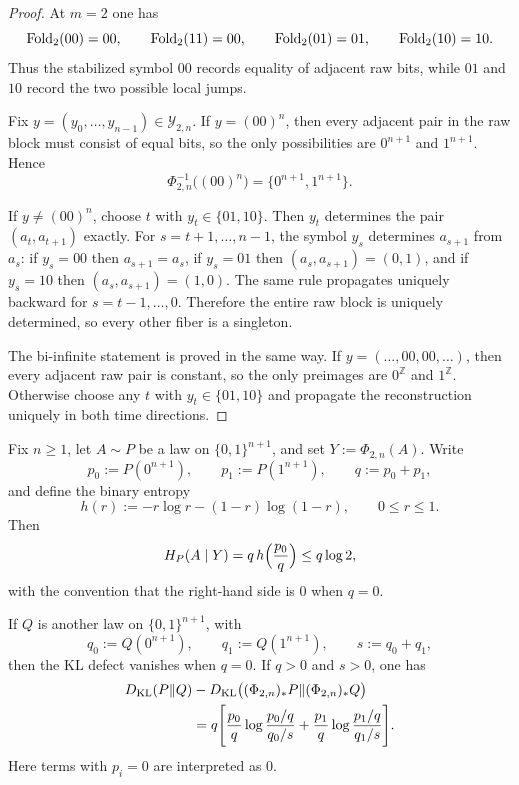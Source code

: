 \begin{proof}
At $m=2$ one has
\[
\mathrm{Fold}_2(00)=00,\qquad \mathrm{Fold}_2(11)=00,\qquad \mathrm{Fold}_2(01)=01,\qquad \mathrm{Fold}_2(10)=10.
\]
Thus the stabilized symbol $00$ records equality of adjacent raw bits, while $01$ and $10$ record the two possible local jumps.

Fix $y=(y_0,\dots,y_{n-1})\in\mathcal Y_{2,n}$. If $y=(00)^n$, then every adjacent pair in the raw block must consist of equal bits, so the only possibilities are $0^{n+1}$ and $1^{n+1}$. Hence
\[
\Phi_{2,n}^{-1}\bigl((00)^n\bigr)=\{0^{n+1},1^{n+1}\}.
\]

If $y\neq (00)^n$, choose $t$ with $y_t\in\{01,10\}$. Then $y_t$ determines the pair $(a_t,a_{t+1})$ exactly. For $s=t+1,\dots,n-1$, the symbol $y_s$ determines $a_{s+1}$ from $a_s$: if $y_s=00$ then $a_{s+1}=a_s$, if $y_s=01$ then $(a_s,a_{s+1})=(0,1)$, and if $y_s=10$ then $(a_s,a_{s+1})=(1,0)$. The same rule propagates uniquely backward for $s=t-1,\dots,0$. Therefore the entire raw block is uniquely determined, so every other fiber is a singleton.

The bi-infinite statement is proved in the same way. If $y=(\ldots,00,00,\ldots)$, then every adjacent raw pair is constant, so the only preimages are $0^{\mathbb Z}$ and $1^{\mathbb Z}$. Otherwise choose any $t$ with $y_t\in\{01,10\}$ and propagate the reconstruction uniquely in both time directions.
\end{proof}

\begin{corollary}\label{cor:m2-defect-formulas}
Fix $n\ge 1$, let $A\sim P$ be a law on $\{0,1\}^{n+1}$, and set $Y:=\Phi_{2,n}(A)$. Write
\[
p_0:=P(0^{n+1}),
\qquad
p_1:=P(1^{n+1}),
\qquad
q:=p_0+p_1,
\]
and define the binary entropy
\[
h(r):=-r\log r-(1-r)\log(1-r),
\qquad 0\le r\le 1.
\]
Then
\[
H_P(A\mid Y)=q\,h\Bigl(\frac{p_0}{q}\Bigr)\le q\log 2,
\]
with the convention that the right-hand side is $0$ when $q=0$.

If $Q$ is another law on $\{0,1\}^{n+1}$, with
\[
q_0:=Q(0^{n+1}),
\qquad
q_1:=Q(1^{n+1}),
\qquad
s:=q_0+q_1,
\]
then the KL defect vanishes when $q=0$. If $q>0$ and $s>0$, one has
\begin{equation}\label{eq:m2-kl-defect}
\begin{aligned}
D_{\mathrm{KL}}(P\|Q)&-D_{\mathrm{KL}}\bigl((\Phi_{2,n})_*P\|(\Phi_{2,n})_*Q\bigr)
\\
&=
q\Biggl[
\frac{p_0}{q}\log\frac{p_0/q}{q_0/s}
+
\frac{p_1}{q}\log\frac{p_1/q}{q_1/s}
\Biggr].
\end{aligned}
\end{equation}
Here terms with $p_i=0$ are interpreted as $0$.
\end{corollary}

